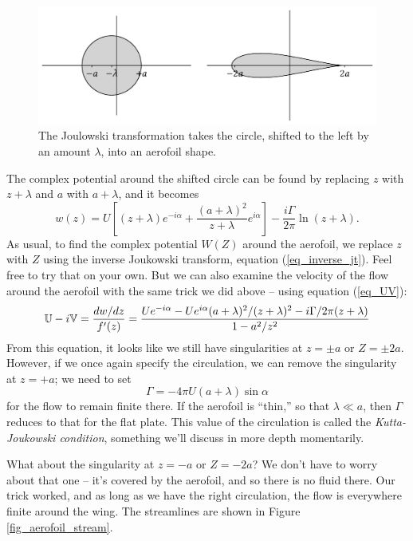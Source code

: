 \begin{figure}
\centering\includegraphics[width=\linewidth]{Figures/Chapter4/fig_aerofoil}
\caption{The Joulowski transformation takes the circle, shifted to the left by an amount $\lambda$, into an aerofoil shape.}
\label{fig_aerofoil}
\end{figure}

The complex potential around the shifted circle can be found by replacing $z$ with $z+\lambda$ and $a$ with $a+\lambda$, and it becomes
\begin{equation}
w(z) = U\left[ (z+\lambda) e^{-i\alpha} + \frac{(a+\lambda)^2}{z+\lambda} e^{i\alpha} \right] - \frac{i\Gamma}{2\pi} \ln (z+\lambda).
\end{equation}
As usual, to find the complex potential $W(Z)$ around the aerofoil, we replace $z$ with $Z$ using the inverse Joukowski transform, equation (\ref{eq_inverse_jt}).  Feel free to try that on your own.  But we can also examine the velocity of the flow around the aerofoil with the same trick we did above -- using equation (\ref{eq_UV}):
\begin{equation}
\mathbb{U} - i\mathbb{V} = \frac{dw/dz}{f'(z)} = \frac{ U e^{-i\alpha} - Ue^{i\alpha} (a+\lambda)^2 / (z+\lambda)^2 - i\Gamma / 2\pi(z+\lambda)}{1-a^2/z^2}
\end{equation}
From this equation, it looks like we still have singularities at $z=\pm a$ or $Z = \pm 2a$.  However, if we once again specify the circulation, we can remove the singularity at $z=+a$; we need to set 
\begin{equation}
\Gamma = -4\pi U (a + \lambda) \sin \alpha
\end{equation}
for the flow to remain finite there.  If the aerofoil is ``thin,'' so that $\lambda \ll a$, then $\Gamma$ reduces to that for the flat plate.  This value of the circulation is called the \emph{Kutta-Joukowski condition}, something we'll discuss in more depth momentarily.

What about the singularity at $z = -a$ or $Z = -2a$?  We don't have to worry about that one -- it's covered by the aerofoil, and so there is no fluid there.  Our trick worked, and as long as we have the right circulation, the flow is everywhere finite around the wing.  The streamlines are shown in Figure \ref{fig_aerofoil_stream}.

